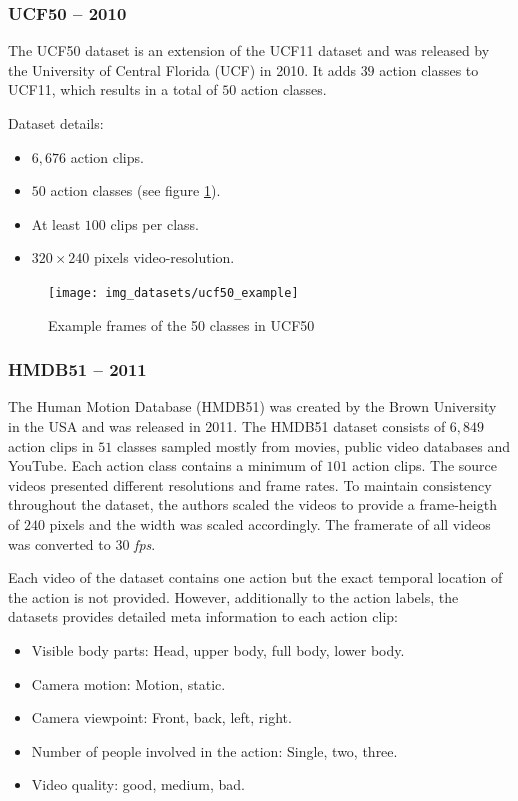 \subsubsection{UCF50 -- 2010}
The UCF50 dataset \cite{reddy_recognizing_2013} is an extension of the UCF11 dataset and was released by the University of Central Florida (UCF) in 2010.
It adds $39$ action classes to UCF11, which results in a total of $50$ action classes.

Dataset details: \cite{kang_review_2016}
\begin{itemize}
    \item $6,676$ action clips.
    \item $50$ action classes (see figure \ref{fig:ucf50_example}).
    \item At least $100$ clips per class.
    \item $320 \times 240$ pixels video-resolution.
\end{itemize}

\begin{figure}[H]
    \centering
    \texttt{[image: img\_datasets/ucf50\_example]}
    \caption{Example frames of the 50 classes in UCF50 \cite{reddy_recognizing_2013}}
    \label{fig:ucf50_example}
\end{figure}


\subsubsection{HMDB51 -- 2011}
The Human Motion Database (HMDB51) \cite{kuehne_hmdb:_2011} was created by the Brown University in the USA and was released in 2011.
The HMDB51 dataset consists of $6,849$ action clips in $51$ classes sampled mostly from movies, public video databases and YouTube.
Each action class contains a minimum of $101$ action clips.
The source videos presented different resolutions and frame rates.
To maintain consistency throughout the dataset, the authors scaled the videos to provide a frame-heigth of $240$ pixels and the width was scaled accordingly.
The framerate of all videos was converted to $30$ \textit{fps}.

Each video of the dataset contains one action but the exact temporal location of the action is not provided.
However, additionally to the action labels, the datasets provides detailed meta information to each action clip: \cite{_serre_????}
\begin{itemize}
    \item Visible body parts: Head, upper body, full body, lower body.
    \item Camera motion: Motion, static.
    \item Camera viewpoint: Front, back, left, right.
    \item Number of people involved in the action: Single, two, three.
    \item Video quality: good, medium, bad.
\end{itemize}

